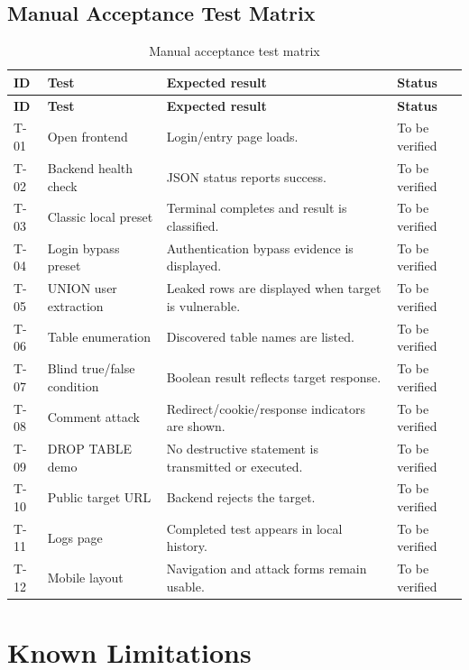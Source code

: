 \documentclass[12pt,a4paper]{article}
\begin{document}
\subsection{Manual Acceptance Test Matrix}

\begin{longtable}{p{1.3cm}p{4.2cm}p{5.0cm}p{3.0cm}}
\caption{Manual acceptance test matrix}\label{tab:test-matrix}\\
\toprule
\textbf{ID} & \textbf{Test} & \textbf{Expected result} & \textbf{Status} \\
\midrule
\endfirsthead
\toprule
\textbf{ID} & \textbf{Test} & \textbf{Expected result} & \textbf{Status} \\
\midrule
\endhead
T-01 & Open frontend & Login/entry page loads. & To be verified \\
T-02 & Backend health check & JSON status reports success. & To be verified \\
T-03 & Classic local preset & Terminal completes and result is classified. & To be verified \\
T-04 & Login bypass preset & Authentication bypass evidence is displayed. & To be verified \\
T-05 & UNION user extraction & Leaked rows are displayed when target is vulnerable. & To be verified \\
T-06 & Table enumeration & Discovered table names are listed. & To be verified \\
T-07 & Blind true/false condition & Boolean result reflects target response. & To be verified \\
T-08 & Comment attack & Redirect/cookie/response indicators are shown. & To be verified \\
T-09 & DROP TABLE demo & No destructive statement is transmitted or executed. & To be verified \\
T-10 & Public target URL & Backend rejects the target. & To be verified \\
T-11 & Logs page & Completed test appears in local history. & To be verified \\
T-12 & Mobile layout & Navigation and attack forms remain usable. & To be verified \\
\bottomrule
\end{longtable}

\section{Known Limitations}
\end{document}
